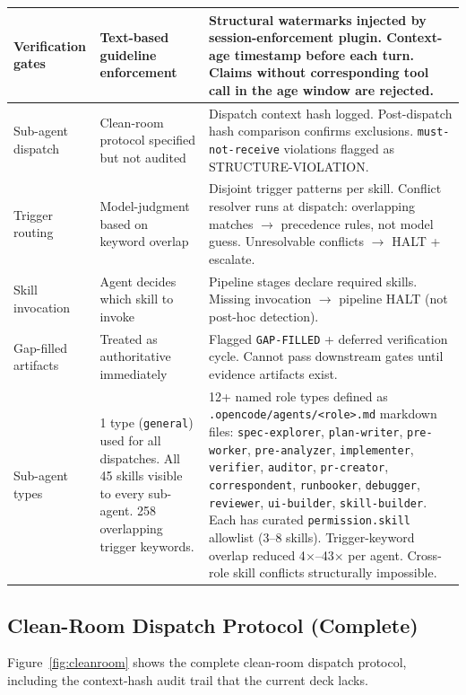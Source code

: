 \documentclass[11pt,a4paper]{article}
\begin{document}
\begin{table}[htbp]
\begin{tabular}{@{}p{3cm}p{4.2cm}p{5.5cm}@{}}
\midrule
Verification gates      & Text-based guideline enforcement           & Structural watermarks injected by session-enforcement plugin.  Context-age timestamp before each turn.  Claims without corresponding tool call in the age window are rejected. \\
\midrule
Sub-agent dispatch      & Clean-room protocol specified but not audited & Dispatch context hash logged.  Post-dispatch hash comparison confirms exclusions.  \texttt{must-not-receive} violations flagged as STRUCTURE-VIOLATION. \\
\midrule
Trigger routing         & Model-judgment based on keyword overlap    & Disjoint trigger patterns per skill.  Conflict resolver runs at dispatch: overlapping matches $\to$ precedence rules, not model guess.  Unresolvable conflicts $\to$ HALT + escalate. \\
\midrule
Skill invocation        & Agent decides which skill to invoke        & Pipeline stages declare required skills.  Missing invocation $\to$ pipeline HALT (not post-hoc detection). \\
\midrule
Gap-filled artifacts    & Treated as authoritative immediately       & Flagged \texttt{GAP-FILLED} + deferred verification cycle.  Cannot pass downstream gates until evidence artifacts exist. \\
\midrule
Sub-agent types        & 1 type (\texttt{general}) used for all dispatches.  All 45 skills visible to every sub-agent. 258 overlapping trigger keywords. & 12+ named role types defined as \texttt{.opencode/agents/<role>.md} markdown files: \texttt{spec-explorer}, \texttt{plan-writer}, \texttt{pre-worker}, \texttt{pre-analyzer}, \texttt{implementer}, \texttt{verifier}, \texttt{auditor}, \texttt{pr-creator}, \texttt{correspondent}, \texttt{runbooker}, \texttt{debugger}, \texttt{reviewer}, \texttt{ui-builder}, \texttt{skill-builder}.  Each has curated \texttt{permission.skill} allowlist (3--8 skills).  Trigger-keyword overlap reduced 4$\times$--43$\times$ per agent.  Cross-role skill conflicts structurally impossible. \\
\bottomrule
\end{tabular}
\end{table}

\subsection{Clean-Room Dispatch Protocol (Complete)}

Figure~\ref{fig:cleanroom} shows the complete clean-room dispatch protocol, including the context-hash audit trail that the current deck lacks.
\end{document}
